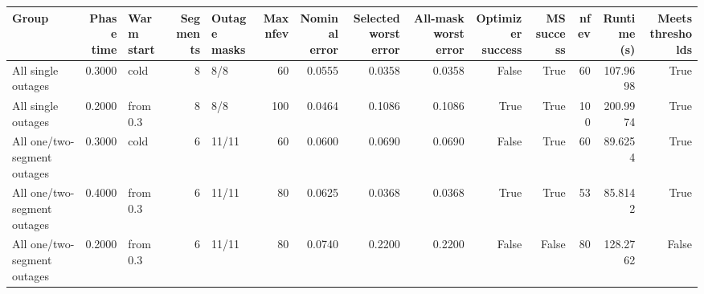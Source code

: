 \begin{tabular}{lrlrlrrrrrrrrr}
\toprule
Group & Phase time & Warm start & Segments & Outage masks & Max nfev & Nominal error & Selected worst error & All-mask worst error & Optimizer success & MS success & nfev & Runtime (s) & Meets thresholds \\
\midrule
All single outages & 0.3000 & cold & 8 & 8/8 & 60 & 0.0555 & 0.0358 & 0.0358 & False & True & 60 & 107.9698 & True \\
All single outages & 0.2000 & from 0.3 & 8 & 8/8 & 100 & 0.0464 & 0.1086 & 0.1086 & True & True & 100 & 200.9974 & True \\
All one/two-segment outages & 0.3000 & cold & 6 & 11/11 & 60 & 0.0600 & 0.0690 & 0.0690 & False & True & 60 & 89.6254 & True \\
All one/two-segment outages & 0.4000 & from 0.3 & 6 & 11/11 & 80 & 0.0625 & 0.0368 & 0.0368 & True & True & 53 & 85.8142 & True \\
All one/two-segment outages & 0.2000 & from 0.3 & 6 & 11/11 & 80 & 0.0740 & 0.2200 & 0.2200 & False & False & 80 & 128.2762 & False \\
\bottomrule
\end{tabular}
